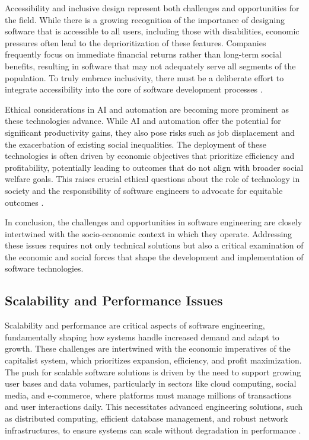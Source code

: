 \begin{refsection}
Accessibility and inclusive design represent both challenges and opportunities for the field. While there is a growing recognition of the importance of designing software that is accessible to all users, including those with disabilities, economic pressures often lead to the deprioritization of these features. Companies frequently focus on immediate financial returns rather than long-term social benefits, resulting in software that may not adequately serve all segments of the population. To truly embrace inclusivity, there must be a deliberate effort to integrate accessibility into the core of software development processes \cite[pp.~85-88]{margolin2020inclusive}.

Ethical considerations in AI and automation are becoming more prominent as these technologies advance. While AI and automation offer the potential for significant productivity gains, they also pose risks such as job displacement and the exacerbation of existing social inequalities. The deployment of these technologies is often driven by economic objectives that prioritize efficiency and profitability, potentially leading to outcomes that do not align with broader social welfare goals. This raises crucial ethical questions about the role of technology in society and the responsibility of software engineers to advocate for equitable outcomes \cite[pp.~127-130]{brynjolfsson2017second}.

In conclusion, the challenges and opportunities in software engineering are closely intertwined with the socio-economic context in which they operate. Addressing these issues requires not only technical solutions but also a critical examination of the economic and social forces that shape the development and implementation of software technologies.

\subsection{Scalability and Performance Issues}

Scalability and performance are critical aspects of software engineering, fundamentally shaping how systems handle increased demand and adapt to growth. These challenges are intertwined with the economic imperatives of the capitalist system, which prioritizes expansion, efficiency, and profit maximization. The push for scalable software solutions is driven by the need to support growing user bases and data volumes, particularly in sectors like cloud computing, social media, and e-commerce, where platforms must manage millions of transactions and user interactions daily. This necessitates advanced engineering solutions, such as distributed computing, efficient database management, and robust network infrastructures, to ensure systems can scale without degradation in performance \cite[pp.~145-148]{reese2009cloud}.


\end{refsection}
